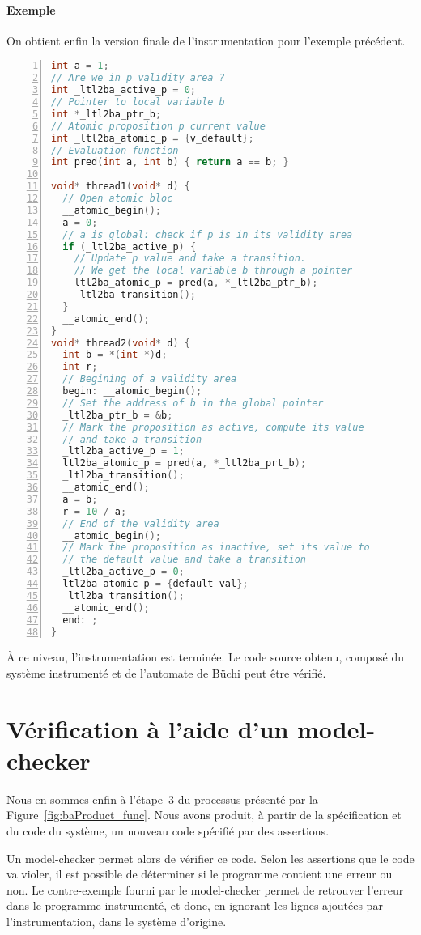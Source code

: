 \paragraph{Exemple}
On obtient enfin la version finale de l'instrumentation pour l'exemple
précédent.

\begin{lstlisting}[language=C, frame=single, numbers=left, xleftmargin=1.6em,
  caption=Instrumentation finale pour des variables locales et globales]
int a = 1;
// Are we in p validity area ?
int _ltl2ba_active_p = 0;
// Pointer to local variable b
int *_ltl2ba_ptr_b;
// Atomic proposition p current value
int _ltl2ba_atomic_p = {v_default};
// Evaluation function
int pred(int a, int b) { return a == b; }

void* thread1(void* d) {
  // Open atomic bloc
  __atomic_begin();
  a = 0;
  // a is global: check if p is in its validity area
  if (_ltl2ba_active_p) {
    // Update p value and take a transition.
    // We get the local variable b through a pointer
    ltl2ba_atomic_p = pred(a, *_ltl2ba_ptr_b);
    _ltl2ba_transition();
  }
  __atomic_end();
}
void* thread2(void* d) {
  int b = *(int *)d;
  int r;
  // Begining of a validity area
  begin: __atomic_begin();
  // Set the address of b in the global pointer
  _ltl2ba_ptr_b = &b;
  // Mark the proposition as active, compute its value
  // and take a transition
  _ltl2ba_active_p = 1;
  ltl2ba_atomic_p = pred(a, *_ltl2ba_prt_b);
  _ltl2ba_transition();
  __atomic_end();
  a = b;
  r = 10 / a;
  // End of the validity area
  __atomic_begin();
  // Mark the proposition as inactive, set its value to
  // the default value and take a transition
  _ltl2ba_active_p = 0;
  ltl2ba_atomic_p = {default_val};
  _ltl2ba_transition();
  __atomic_end();
  end: ;
}
\end{lstlisting}

À ce niveau, l'instrumentation est terminée. Le code source obtenu, composé du
système instrumenté et de l'automate de Büchi peut être vérifié.

\section{Vérification à l'aide d'un model-checker}

Nous en sommes enfin à l'étape~3 du processus présenté par la
Figure~\ref{fig:baProduct_func}. Nous avons produit, à partir de la
spécification et du code du système, un nouveau code spécifié par des
assertions.

Un model-checker permet alors de vérifier ce code. Selon les assertions que le
code va violer, il est possible de déterminer si le programme contient une
erreur ou non. Le contre-exemple fourni par le model-checker permet de
retrouver l'erreur dans le programme instrumenté, et donc, en ignorant les
lignes ajoutées par l'instrumentation, dans le système d'origine.

